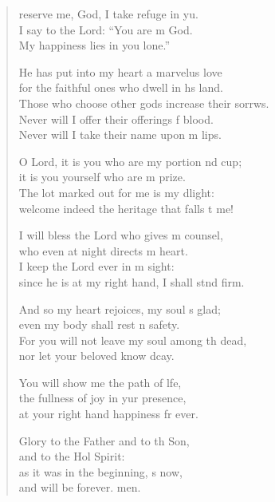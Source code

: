 \settowidth{\versewidth}{Those who choose other gods increase their sorrows. +}
\begin{verse}%
  \begin{patverse}
reserve me, God, I take refuge in yu.\Flex\\
I say to the Lord: “You are m God.\Med\\
My happiness lies in you lone.”

He has put into my heart a marvelus love\Med\\
for the faithful ones who dwell in h\pointup{\i}s land.\\
Those who choose other gods increase their sorrws.\Flex\\
Never will I offer their offerings f blood.\Med\\
Never will I take their name upon m lips.

O Lord, it is you who are my portion nd cup;\Med\\
it is you yourself who are m prize.\\
The lot marked out for me is my dlight:\Med\\
welcome indeed the heritage that falls t me!

I will bless the Lord who gives m counsel,\Med\\
who even at night directs m heart.\\
I keep the Lord ever in m sight:\Med\\
since he is at my right hand, I shall stnd firm.

And so my heart rejoices, my soul \pointup{\i}s glad;\Med\\
even my body shall rest \pointup{\i}n safety.\\
For you will not leave my soul among th dead,\Med\\
nor let your beloved know dcay.

You will show me the path of l\pointup{\i}fe,\Flex\\
the fullness of joy in yur presence,\Med\\
at your right hand happiness fr ever.

Glory to the Father and to th Son,\Med\\
and to the Hol Spirit:\\
as it was in the beginning, \pointup{\i}s now,\Med\\
and will be forever. men. 
  \end{patverse}
\end{verse}
